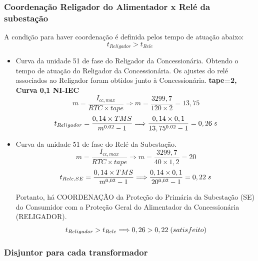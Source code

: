 \subsubsection{Coordenação Religador do Alimentador x Relé da subestação}
A condição para haver coordenação é definida pelos tempo de atuação abaixo:
\begin{equation*}
{t}_{Religador} > {t}_{ Rele} 
\end{equation*}
\begin{itemize}
\item Curva da unidade 51 de fase do Religador da Concessionária.
Obtendo o tempo de atuação do Religador da Concessionária. Os ajustes do relé associados ao Religador foram obtidos junto à Concessionária. \textbf{tape=2, Curva 0,1 NI-IEC}
\begin{equation*}
m=\frac{{I}_{cc,max}}{RTC\times tape} \Longrightarrow m= \frac{3299,7}{120\times 2}=13,75 
\end{equation*}
\begin{equation*}
{t}_{Religador} = \frac{0,14 \times TMS}{m^{0,02}-1} \Longrightarrow \frac{0,14 \times 0,1}{13,75^{0,02}-1}=0,26\hspace{0.1cm}s 
\end{equation*}
\item Curva da unidade 51 de fase do Relé da Subestação.
\begin{equation*}
m=\frac{{I}_{cc,max}}{RTC\times tape} \Longrightarrow m= \frac{3299,7}{40\times 1,2}=20 
\end{equation*}
\begin{equation*}
{t}_{Rele,SE} = \frac{0,14 \times TMS}{m^{0,02}-1} \Longrightarrow \frac{0,14 \times 0,1}{20^{0,02}-1}=0,22\hspace{0.1cm}s 
\end{equation*}

Portanto, há COORDENAÇÃO da Proteção do Primária da Subestação (SE) do Consumidor com a Proteção Geral do Alimentador da Concessionária (RELIGADOR).
\begin{equation*}
{t}_{Religador} > {t}_{Rele} \Longrightarrow  0,26 > 0,22 \hspace{0.1cm}(satisfeito)
\end{equation*}

\end{itemize}
\subsubsection{Disjuntor para cada transformador}

